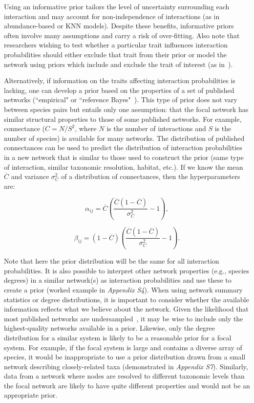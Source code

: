 \documentclass[12pt]{article}
\begin{document}
\begin{spacing}{2.0}
        Using an informative prior tailors the level of uncertainty surrounding each interaction and may account for non-independence of interactions (as in abundance-based or KNN models). Despite these benefits, informative priors often involve many assumptions and carry a risk of over-fitting. Also note that researchers wishing to test whether a particular trait influences interaction probabilities should either exclude that trait from their prior or model the network using priors which include and exclude the trait of interest (as in~\citet{Weinstein2017a}).


        Alternatively, if information on the traits affecting interaction probabilities is lacking, one can develop a prior based on the properties of a set of published networks (``empirical" or ``reference Bayes"~\citet{Spiegelhalter2000}). This type of prior does not vary between species pairs but entails only one assumption: that the focal network has similar structural properties to those of some published networks. For example, connectance ($C=N/S^2$, where $N$ is the number of interactions and $S$ is the number of species) is available for many networks. The distribution of published connectances can be used to predict the distribution of interaction probabilities in a new network that is similar to those used to construct the prior (same type of interaction, similar taxonomic resolution, habitat, etc.). If we know the mean $\overline{C}$ and variance $\sigma_C^2$ of a distribution of connectances, then the hyperparameters are:

        \begin{equation}
        \alpha_{ij}=\overline{C}(\frac{\overline{C}(1-\overline{C})}{\sigma_C^2}-1) ,
        \end{equation}

        \begin{equation}
        \beta_{ij}=(1-\overline{C})(\frac{\overline{C}(1-\overline{C})}{\sigma_C^2}-1) .
        \end{equation}
  

        Note that here the prior distribution will be the same for all interaction probabilities. It is also possible to interpret other network properties (e.g., species degrees) in a similar network(s) as interaction probabilities and use these to create a prior (worked example in \emph{Appendix S4}). When using network summary statistics or degree distributions, it is important to consider whether the available information reflects what we believe about the network. Given the likelihood that most published networks are undersampled~\citep{Jordano2016}, it may be wise to include only the highest-quality networks available in a prior. Likewise, only the degree distribution for a similar system is likely to be a reasonable prior for a focal system. For example, if the focal system is large and contains a diverse array of species, it would be inappropriate to use a prior distribution drawn from a small network describing closely-related taxa (demonstrated in \emph{Appendix S7}). Similarly, data from a network where nodes are resolved to different taxonomic levels than the focal network are likely to have quite different properties and would not be an appropriate prior.



\end{spacing}
\end{document}
